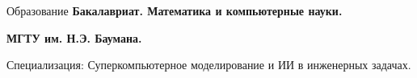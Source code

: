 \begin{rubric}{Образование}
\entry*[2022 -- 2026]%
	\textbf{Бакалавриат. Математика и компьютерные науки.} 

	\textbf{МГТУ им. Н.Э. Баумана.} 

	Специализация: Суперкомпьютерное моделирование и ИИ в инженерных задачах.
\end{rubric}
